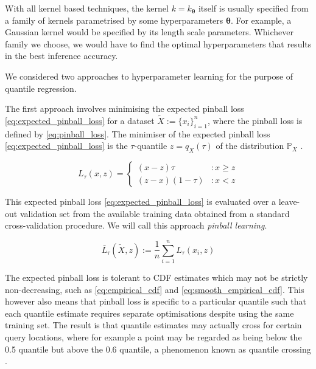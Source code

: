 \documentclass[twoside]{article} \usepackage{aistats2017}
\theoremstyle{definition}
\theoremstyle{theorem}
\newcommand{\rv}[1]{{#1}}
\newcommand{\ds}[1]{\tilde{#1}}
\begin{document}
	With all kernel based techniques, the kernel $k = k_{\bm{\theta}}$ itself is usually specified from a family of kernels parametrised by some hyperparameters $\bm{\theta}$. For example, a Gaussian kernel would be specified by its length scale parameters. Whichever family we choose, we would have to find the optimal hyperparameters that results in the best inference accuracy. %
	
	We considered two approaches to hyperparameter learning for the purpose of quantile regression.
	
	The first approach involves minimising the expected pinball loss \eqref{eq:expected_pinball_loss} for a dataset $\ds{X} := \{x_{i}\}_{i = 1}^{n}$, where the pinball loss is defined by \eqref{eq:pinball_loss}. The minimiser of the expected pinball loss \eqref{eq:expected_pinball_loss} is the $\tau$-quantile $z = q_{\rv{X}}(\tau)$ of the distribution $\mathbb{P}_{\rv{X}}$ \citep{koenker1978regression}.
	
	\begin{equation}
		L_{\tau}(x, z) = \left\{ \begin{array}{lr}
			(x - z) \tau & : x \geq z \\
			(z - x) (1 - \tau) & : x < z
		\end{array} \right.
	\label{eq:pinball_loss}
	\end{equation}
	
	This expected pinball loss \eqref{eq:expected_pinball_loss} is evaluated over a leave-out validation set from the available training data obtained from a standard cross-validation procedure. We will call this approach \textit{pinball learning}.
	
	\begin{equation}
		\bar{L}_{\tau}(\ds{X}, z) := \frac{1}{n} \sum_{i = 1}^{n} L_{\tau}(x_{i}, z)
	\label{eq:expected_pinball_loss}
	\end{equation}
	
	The expected pinball loss is tolerant to CDF estimates which may not be strictly non-decreasing, such as \eqref{eq:empirical_cdf} and \eqref{eq:smooth_empirical_cdf}. This however also means that pinball loss is specific to a particular quantile such that each quantile estimate requires separate optimisations despite using the same training set. The result is that quantile estimates may actually cross for certain query locations, where for example a point may be regarded as being below the 0.5 quantile but above the 0.6 quantile, a phenomenon known as quantile crossing \citep{he1997quantile}. 
	
\end{document}
